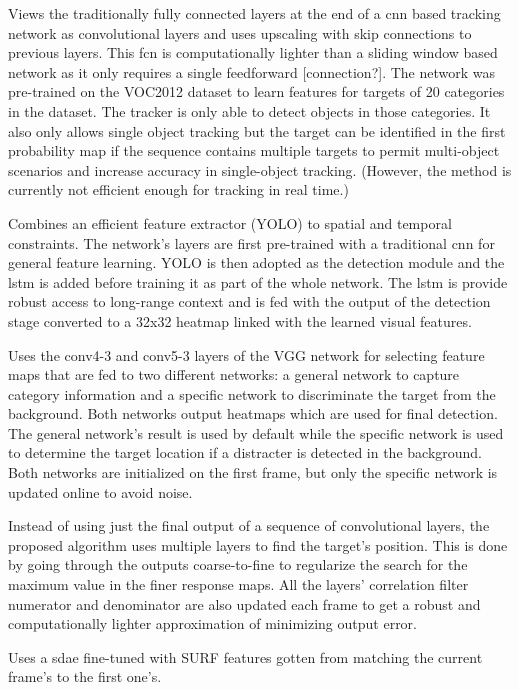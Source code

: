 \cite{FCN_TRACK}
Views the traditionally fully connected layers at the end of a \ac{cnn} based
tracking network as convolutional layers and uses upscaling with skip connections
to previous layers. This \ac{fcn} is computationally lighter than a sliding window
based network as it only requires a single feedforward [connection?]. The network
was pre-trained on the VOC2012 dataset to learn features for targets of 20 categories
in the dataset. The tracker is only able to detect objects in those categories.
It also only allows single object tracking but the target can be identified in the
first probability map if the sequence contains multiple targets to permit multi-object
scenarios and increase accuracy in single-object tracking. (However, the method is
currently not efficient enough for tracking in real time.)

\cite{SPAT_RCN}
Combines an efficient feature extractor (YOLO) to spatial and temporal constraints.
The network's layers are first pre-trained with a traditional \ac{cnn} for general
feature learning. YOLO is then adopted as the detection module and the \ac{lstm}
is added before training it as part of the whole network. The \ac{lstm} is provide
robust access to long-range context and is fed with the output of the detection
stage converted to a 32x32 heatmap linked with the learned visual features.

\cite{FCN_TRACK_2}
Uses the conv4-3 and conv5-3 layers of the VGG network for selecting feature maps
that are fed to two different networks: a general network to capture category information
and a specific network to discriminate the target from the background. Both networks
output heatmaps which are used for final detection. The general network's result is used
by default while the specific network is used to determine the target location if
a distracter is detected in the background. Both networks are initialized on the first
frame, but only the specific network is updated online to avoid noise.

\cite{HIERARCH_FEATS}
Instead of using just the final output of a sequence of convolutional layers, the
proposed algorithm uses multiple layers to find the target's position. This is done
by going through the outputs coarse-to-fine to regularize the search for the maximum
value in the finer response maps. All the layers' correlation filter numerator and
denominator are also updated each frame to get a robust and computationally lighter
approximation of minimizing output error.

\cite{SMS_DLT}
Uses a \ac{sdae} fine-tuned with SURF features gotten from matching the current frame's
to the first one's.
